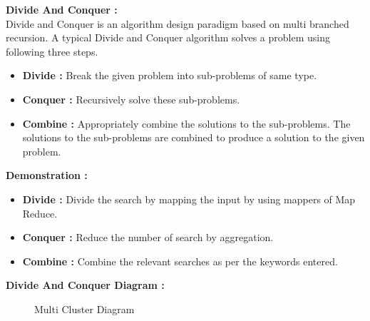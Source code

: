 \documentclass[oneside,a4paper,12pt]{report}
\begin{document}
{\begin{appendices}
\textbf{Divide And Conquer : } \\
Divide and Conquer is an algorithm design paradigm based on multi branched recursion. A typical Divide and Conquer algorithm solves a problem using following three steps. \\

\begin{itemize}
\item \textbf{Divide :} Break the given problem into sub-problems of same type.
\item \textbf{Conquer :} Recursively solve these sub-problems.	
\item \textbf{Combine :} Appropriately combine the solutions to the sub-problems. The solutions to the sub-problems are combined to produce a solution to the given problem.
\end{itemize}

\textbf{Demonstration : } \\

\begin{itemize}
\item \textbf{Divide :} Divide the search by mapping the input by using mappers of Map Reduce.
\item \textbf{Conquer :} Reduce the number of search by aggregation.
\item \textbf{Combine :} Combine the relevant searches as per the keywords entered.
\end{itemize}

\pagebreak
\textbf{Divide And Conquer Diagram : }

 \begin{center}
	\begin{figure}[!htbp]
		\centering
	  \caption{Multi Cluster Diagram}
	  \label{fig:arch-dig}
	\end{figure}
\end{center} 


\end{appendices}}
\end{document}
